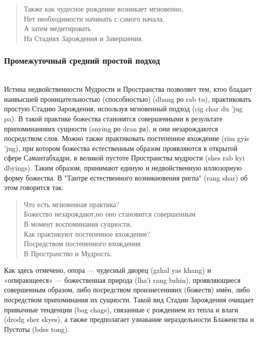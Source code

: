 \begin{verse}
Также как чудесное рождение возникает мгновенно,\\
Нет необходимости начинать с самого начала,\\
А затем медитировать\\
На Стадиях Зарождения и Завершения.\\
\end{verse}

\newpage
\subsubsection{Промежуточный средний простой подход}
\\
Истина недвойственности Мудрости и Пространства позволяет тем, ктоо бладает
наивысшей проницательностью (способно\-стью) (dbang ро rab tu), практиковать простую
Стадию Зарождения, используя мгновенный подход (cig char du 'jug pa). В такой практике
божества становятся совершенными в результате припоминанияих сущности (snying ро dran
ра), и они незарождаются посредством слов. Можно также практиковать постепенное
вхождение (rim gyis 'jug), при котором божества естественным образом проявляются в
открытой сфере Самантабхадри, в великой пустоте Пространства мудрости (shes rab kyi
dbyings). Таким образом, принимают единую и недвойственную иллюзорную форму
божества. В "Тантре естественного возникновения ригпа" (rang shar) об этом говорится так:

\begin{verse}
Что есть мгновенная практика?\\
Божество незарождают,но оно становится совершенным\\
В момент воспоминания сущности.\\
Как практикуют постепенное вхождение?\\
Посредством постепенного вхождения\\
В Пространство и Мудрость.\\
\end{verse}

Как здесь отмечено, опора — чудесный дворец (gzhal yas khang) и «опирающееся» —
божественная природа (lha'i rang bzhin), проявляющиеся совершенным
образом, либо посредством произнесенияих (божеств) имён, либо посредством
припоминания их сущности. Такой вид Стадии Зарождения очищает привычные тенденции
(bag chags), связанные с рождением из тепла и влаги (drodg sher skyes), а также
предполагает узнавание нераздельности Блаженства и Пустоты (bdes tong).

